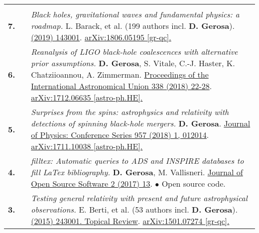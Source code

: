 {\begin{longtable}{rp{0.3cm}p{15.8cm}}
\vspace{0.09cm}\\
%
\textbf{7.} & & \textit{Black holes, gravitational waves and fundamental physics: a roadmap.}
\newline{}
L. Barack, et al. (199 authors incl. \textbf{D. Gerosa}).
\newline{}
\href{https://iopscience.iop.org/article/10.1088/1361-6382/ab0587}{\cqg 36 (2019) 143001}. \href{https://arxiv.org/abs/1806.05195}{arXiv:1806.05195 [gr-qc].}
\vspace{0.09cm}\\
%
\textbf{6.} & & \textit{Reanalysis of LIGO black-hole coalescences with alternative prior assumptions.}
\newline{}
\textbf{D. Gerosa}, S. Vitale, C.-J. Haster, K. Chatziioannou, A. Zimmerman.
\newline{}
\href{https://doi.org/10.1017/S1743921318003587}{Proceedings of the International Astronomical Union 338 (2018) 22-28}. \href{https://arxiv.org/abs/1712.06635}{arXiv:1712.06635 [astro-ph.HE].}
\vspace{0.09cm}\\
%
\textbf{5.} & & \textit{Surprises from the spins: astrophysics and relativity with detections of spinning black-hole mergers.}
\newline{}
\textbf{D. Gerosa}.
\newline{}
\href{http://dx.doi.org/10.1088/1742-6596/957/1/012014}{Journal of Physics: Conference Series 957 (2018) 1, 012014}. \href{https://arxiv.org/abs/1711.10038}{arXiv:1711.10038 [astro-ph.HE].}
\vspace{0.09cm}\\
%
\textbf{4.} & & \textit{filltex: Automatic queries to ADS and INSPIRE databases to fill LaTex bibliography.}
\newline{}
\textbf{D. Gerosa}, M. Vallisneri.
\newline{}
\href{http://dx.doi.org/10.21105/joss.00222}{Journal of Open Source Software 2 (2017) 13}. 
\newline{}
\textcolor{color1}{$\bullet$} Open source code.
\vspace{0.09cm}\\
%
\textbf{3.} & & \textit{Testing general relativity with present and future astrophysical observations.}
\newline{}
E. Berti, et al. (53 authors incl. \textbf{D. Gerosa}).
\newline{}
\href{http://dx.doi.org/10.1088/0264-9381/32/24/243001}{\cqg 32 (2015) 243001. Topical Review}. \href{https://arxiv.org/abs/1501.07274}{arXiv:1501.07274 [gr-qc].}

\end{longtable}}
